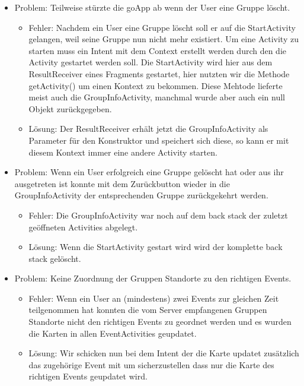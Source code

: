 \documentclass{scrartcl}
\begin{document}
		\begin{itemize}
			\item Problem: Teilweise stürzte die goApp ab wenn der User eine Gruppe löscht.
			\begin{itemize}
				\item Fehler: Nachdem ein User eine Gruppe löscht soll er auf die StartActivity gelangen, weil seine Gruppe nun nicht mehr existiert. Um eine Activity zu starten muss ein Intent mit dem Context erstellt werden durch den die  Activity gestartet werden soll. Die StartActivity wird hier aus dem ResultReceiver eines Fragments gestartet, hier nutzten wir die Methode getActivity() um einen Kontext zu bekommen. Diese Mehtode lieferte meist auch die GroupInfoActivity, manchmal wurde aber auch ein null Objekt zurückgegeben.
				\item Lösung: Der ResultReceiver erhält jetzt die GroupInfoActivity als Parameter für den Konstruktor und speichert sich diese, so kann er mit diesem Kontext immer eine andere Activity starten.
			\end{itemize}

			\item Problem: Wenn ein User erfolgreich eine Gruppe gelöscht hat oder aus ihr ausgetreten ist konnte mit dem Zurückbutton wieder in die GroupInfoActivity der entsprechenden Gruppe zurückgekehrt werden.
			\begin{itemize}
				\item Fehler: Die GroupInfoActivity war noch auf dem back stack der zuletzt geöffneten Activities abgelegt. 
				\item Lösung: Wenn die StartActivity gestart wird wird der komplette back stack gelöscht.
			\end{itemize}

			\item Problem: Keine Zuordnung der Gruppen Standorte zu den richtigen Events.
			\begin{itemize}
				\item Fehler: Wenn ein User an (mindestens) zwei Events zur gleichen Zeit teilgenommen hat konnten die vom Server empfangenen Gruppen Standorte nicht den richtigen Events zu geordnet werden und es wurden die Karten in allen EventActivities geupdatet.
				\item Lösung: Wir schicken nun bei dem Intent der die Karte updatet zusätzlich das zugehörige Event mit um sicherzustellen dass nur die Karte des richtigen Events geupdatet wird.
			\end{itemize}

			
		\end{itemize}
	
\end{document}
